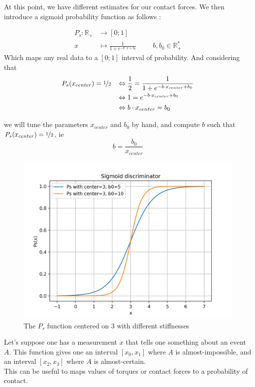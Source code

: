\documentclass[a4paper,10pt]{article}
\begin{document}
At this point, we have different estimates for our contact forces. We then introduce a sigmoid probability function as follows :

\begin{align*}
  P_s : \mathbb{R}_+ &\rightarrow [0; 1]\\
  x &\mapsto \frac{1}{1 + e^{-b \cdot x + b_0}} \hspace{1cm} b, b_0  \in\mathbb{R}_+^*
\end{align*}
Which maps any real data to a $[0; 1]$ interval of probability.
And considering that
\begin{align*}
	P_s(x_{center}) = \nicefrac{1}{2} \hspace{3mm} &\Leftrightarrow \frac{1}{2} = \frac{1}{1 + e^{-b \cdot x_{center} + b_0}}\\
						&\Leftrightarrow 1  =e^{-b \cdot x_{center} + b_0}\\
						&\Leftrightarrow b\cdot x_{center} = b_0
\end{align*}

we will tune the parameters $x_{center}$ and $b_0$ by hand, and compute $b$ such that $P_s(x_{center}) = \nicefrac{1}{2} $, ie
$$b = \frac{b_0}{x_{center}}$$

\begin{figure}[H]
\centering
  \includegraphics[width=\linewidth, angle=0, scale=0.6]{./images/ProbDisc_1.png}
  \caption{The $P_s$ function centered on $3$ with different stiffnesses}
\end{figure}

Let's suppose one has a measurement $x$ that tells one something about an event $A$. This function gives one an interval $[x_0, x_1]$ where $A$ is almost-impossible, and an interval $[x_2, x_3]$ where $A$ is almost-certain.\\
This can be useful to maps values of torques or contact forces to a probability of contact.
\end{document}
